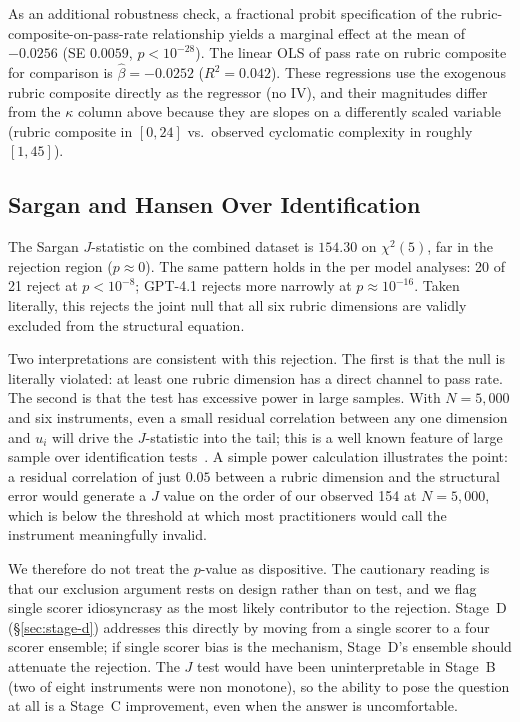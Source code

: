 \documentclass[conference]{IEEEtran}
\begin{document}
As an additional robustness check, a fractional probit specification of the rubric-composite-on-pass-rate relationship yields a marginal effect at the mean of $-0.0256$ (SE $0.0059$, $p<10^{-28}$). The linear OLS of pass rate on rubric composite for comparison is $\hat{\beta}=-0.0252$ ($R^2=0.042$). These regressions use the exogenous rubric composite directly as the regressor (no IV), and their magnitudes differ from the $\kappa$ column above because they are slopes on a differently scaled variable (rubric composite in $[0,24]$ vs.\ observed cyclomatic complexity in roughly $[1,45]$).

\subsection{Sargan and Hansen Over Identification}

The Sargan $J$-statistic on the combined dataset is $154.30$ on $\chi^2(5)$, far in the rejection region ($p\approx 0$). The same pattern holds in the per model analyses: 20 of 21 reject at $p<10^{-8}$; GPT-4.1 rejects more narrowly at $p\approx 10^{-16}$. Taken literally, this rejects the joint null that all six rubric dimensions are validly excluded from the structural equation.

Two interpretations are consistent with this rejection. The first is that the null is literally violated: at least one rubric dimension has a direct channel to pass rate. The second is that the test has excessive power in large samples. With $N=5{,}000$ and six instruments, even a small residual correlation between any one dimension and $u_i$ will drive the $J$-statistic into the tail; this is a well known feature of large sample over identification tests~\cite{bowsher2002reject}. A simple power calculation illustrates the point: a residual correlation of just $0.05$ between a rubric dimension and the structural error would generate a $J$ value on the order of our observed 154 at $N=5{,}000$, which is below the threshold at which most practitioners would call the instrument meaningfully invalid.

We therefore do not treat the $p$-value as dispositive. The cautionary reading is that our exclusion argument rests on design rather than on test, and we flag single scorer idiosyncrasy as the most likely contributor to the rejection. Stage~D (\S\ref{sec:stage-d}) addresses this directly by moving from a single scorer to a four scorer ensemble; if single scorer bias is the mechanism, Stage~D's ensemble should attenuate the rejection. The $J$ test would have been uninterpretable in Stage~B (two of eight instruments were non monotone), so the ability to pose the question at all is a Stage~C improvement, even when the answer is uncomfortable.
\end{document}
